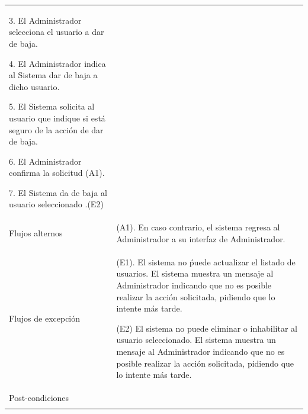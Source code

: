 \begin{longtable}{@{\extracolsep{8pt}}l p{8.5cm}}
 3. El Administrador selecciona el usuario a dar de baja. \par\vspace{.1cm}

 4. El Administrador indica al Sistema dar de baja a dicho usuario. \par\vspace{.1cm}

 5. El Sistema solicita al usuario que indique si está seguro de la acción de dar de baja. \par\vspace{.1cm}

 6. El Administrador confirma la solicitud (A1). \par\vspace{.1cm}

 7. El Sistema da de baja al usuario seleccionado .(E2) \par\vspace{.1cm}

\\

\hspace{.2cm}Flujos alternos & 
\par (A1). En caso contrario, el sistema regresa al Administrador a su interfaz de Administrador.



\\

\hspace{.2cm}Flujos de excepción & 
\par\vspace{.1cm} (E1). El sistema no ṕuede actualizar el listado de usuarios. El sistema muestra un mensaje al Administrador indicando que no es posible realizar la acción solicitada, pidiendo que lo intente más tarde.

\par\vspace{.1cm} (E2) El sistema no puede eliminar o inhabilitar al usuario seleccionado. El sistema muestra un mensaje al Administrador indicando que no es posible realizar la acción solicitada, pidiendo que lo intente más tarde.


\\%

\hspace{.2cm}Post-condiciones & 
\\
\hline

 \\
\end{longtable}
\endgroup


